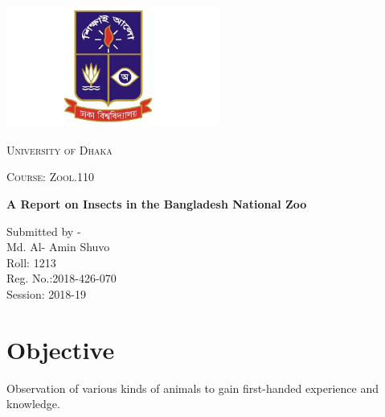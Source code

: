 \documentclass[a4paper, 12pt]{article}
\begin{document}
\begin{titlepage}
\centering
\includegraphics[width=7cm,height=4cm]{Image/dulogoblue.jpg}\\
{\scshape\LARGE University of Dhaka \par}
\vspace{1cm}
{\scshape\Large Course: Zool.110\par}
\vspace{1.5cm}
{\huge\bfseries A Report on Insects in the Bangladesh National Zoo\par}
\vspace{2cm}
{}
\vfill
Submitted by - \\
\vspace{0.5cm}
Md. Al- Amin Shuvo\\ Roll: 1213\\Reg. No.:2018-426-070\\Session: 2018-19
\vfill
\SetDate[01/12/2019]
{\large \today\par}
\end{titlepage}





\newpage
\tableofcontents
\newpage
\section{Objective}
Observation of various kinds of animals to gain first-handed experience and knowledge.
\end{document}
